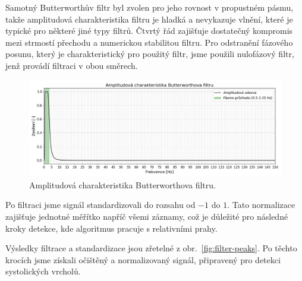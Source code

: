 Samotný Butterworthův filtr byl zvolen pro jeho rovnost v propustném pásmu, takže amplitudová charakteristika filtru je hladká a nevykazuje vlnění, které je typické pro některé jiné typy filtrů.
Čtvrtý řád zajišťuje dostatečný kompromis mezi strmostí přechodu a numerickou stabilitou filtru.
Pro odstranění fázového posunu, který je charakteristický pro použitý filtr, jsme použili nulofázový filtr, jenž provádí filtraci v obou směrech.

\begin{figure}[h]
	\label{fig:my_AFC}
	\centering
	\includegraphics[width=1\textwidth]{./obrazky/My_AFC.png}
	\vspace{-5mm}
	\caption[Vlastní amplitudová charakteristika Butterworthova filtru]{Amplitudová charakteristika Butterworthova filtru.}
	\vspace{-5mm}
\end{figure}

Po filtraci jsme signál standardizovali do rozsahu od \(-1\) do \(1\).
Tato normalizace zajišťuje jednotné měřítko napříč všemi záznamy, což je důležité pro následné kroky detekce, kde algoritmus pracuje s relativními prahy.

Výsledky filtrace a standardizace jsou zřetelné z obr.~\ref{fig:filter-peaks}.
Po těchto krocích jsme získali očištěný a normalizovaný signál, připravený pro detekci systolických vrcholů.

